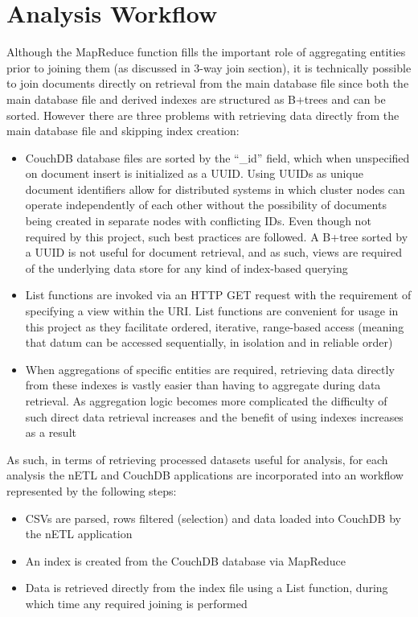 

\section{Analysis Workflow}
Although the MapReduce function fills the important role of aggregating entities prior to joining them (as discussed in 3-way join section), it is technically possible to join documents directly on retrieval from the main database file since both the main database file and derived indexes are structured as B+trees and can be sorted. However there are three problems with retrieving data directly from the main database file and skipping index creation:

\begin{itemize}
    \item CouchDB database files are sorted by the ``\_id'' field, which when unspecified on document insert is initialized as a UUID. Using UUIDs as unique document identifiers allow for distributed systems in which cluster nodes can operate independently of each other without the possibility of documents being created in separate nodes with conflicting IDs. Even though not required by this project, such best practices are followed. A B+tree sorted by a UUID is not useful for document retrieval, and as such, views are required of the underlying data store for any kind of index-based querying
    \item List functions are invoked via an HTTP GET request with the requirement of specifying a view within the URI. List functions are convenient for usage in this project as they facilitate ordered, iterative, range-based access (meaning that datum can be accessed sequentially, in isolation and in reliable order)
    \item When aggregations of specific entities are required, retrieving data directly from these indexes is vastly easier than having to aggregate during data retrieval. As aggregation logic becomes more complicated the difficulty of such direct data retrieval increases and the benefit of using indexes increases as a result
\end{itemize}

As such, in terms of retrieving processed datasets useful for analysis, for each analysis the nETL and CouchDB applications are incorporated into an workflow represented by the following steps:

\begin{itemize}
    \item CSVs are parsed, rows filtered (selection) and data loaded into CouchDB by the nETL application
    \item An index is created from the CouchDB database via MapReduce
    \item Data is retrieved directly from the index file using a List function, during which time any required joining is performed
\end{itemize}

